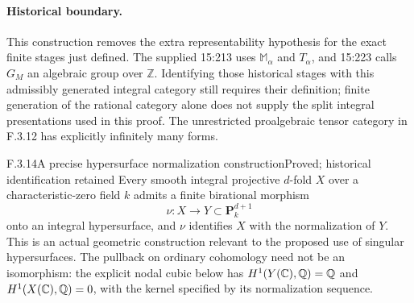 \paragraph{Historical boundary.}
This construction removes the extra representability hypothesis for the exact finite stages just defined. The supplied 15:213 uses $\mathbb M_\alpha$ and $T_\alpha$, and 15:223 calls $G_M$ an algebraic group over $\mathbb Z$. Identifying those historical stages with this admissibly generated integral category still requires their definition; finite generation of the rational category alone does not supply the split integral presentations used in this proof. The unrestricted proalgebraic tensor category in F.3.12 has explicitly infinitely many forms.

\begin{result}{F.3.14}{A precise hypersurface normalization construction}{Proved; historical identification retained}
Every smooth integral projective $d$-fold $X$ over a characteristic-zero field $k$ admits a finite birational morphism
\[
 \nu:X\longrightarrow Y\subset\mathbf P_k^{d+1}
\]
onto an integral hypersurface, and $\nu$ identifies $X$ with the normalization of $Y$.
This is an actual geometric construction relevant to the proposed use of singular hypersurfaces. The pullback on ordinary cohomology need not be an isomorphism: the explicit nodal cubic below has $H^1(Y(\mathbb C),\mathbb Q)=\mathbb Q$ and $H^1(X(\mathbb C),\mathbb Q)=0$, with the kernel specified by its normalization sequence.
\end{result}
